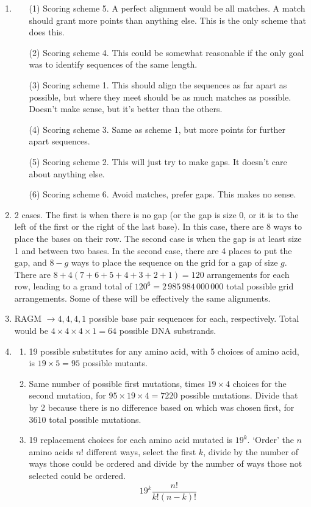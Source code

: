 \documentclass{article}
\begin{document}
\begin{enumerate}
	\item 
	\begin{enumerate}
		\item[(1)] Scoring scheme 5. A perfect alignment would be all matches. A match should grant more points than anything else. This is the only scheme that does this.
		\item[(2)] Scoring scheme 4. This could be somewhat reasonable if the only goal was to identify sequences of the same length.
		\item[(3)] Scoring scheme 1. This should align the sequences as far apart as possible, but where they meet should be as much matches as possible. Doesn't make sense, but it's better than the others.
		\item[(4)] Scoring scheme 3. Same as scheme 1, but more points for further apart sequences.
		\item[(5)] Scoring scheme 2. This will just try to make gaps. It doesn't care about anything else.
		\item[(6)] Scoring scheme 6. Avoid matches, prefer gaps. This makes no sense.
	\end{enumerate}
	\item 2 cases. The first is when there is no gap (or the gap is size 0, or it is to the left of the first or the right of the last base). In this case, there are 8 ways to place the bases on their row. The second case is when the gap is at least size 1 and between two bases. In the second case, there are 4 places to put the gap, and $8-g$ ways to place the sequence on the grid for a gap of size $g$. There are $8 + 4(7+6+5+4+3+2+1) = 120$ arrangements for each row, leading to a grand total of $120^6 = 2\,985\,984\,000\,000$ total possible grid arrangements. Some of these will be effectively the same alignments.
	\item RAGM $\rightarrow 4,4,4,1$ possible base pair sequences for each, respectively. Total would be $4\times 4\times 4\times 1 = 64$ possible DNA substrands.
	\item \begin{enumerate}
		\item 19 possible substitutes for any amino acid, with 5 choices of amino acid, is $19\times 5 = 95$ possible mutants.
		\item Same number of possible first mutations, times $19\times 4$ choices for the second mutation, for $95\times 19\times 4 = 7220$ possible mutations. Divide that by 2 because there is no difference based on which was chosen first, for $3610$ total possible mutations.
		\item 19 replacement choices for each amino acid mutated is $19^k$. `Order' the $n$ amino acids $n!$ different ways, select the first $k$, divide by the number of ways those could be ordered and divide by the number of ways those not selected could be ordered. $$19^k \frac{n!}{k!(n-k)!}$$
	\end{enumerate}
\end{enumerate}
\pagebreak
\end{document}
